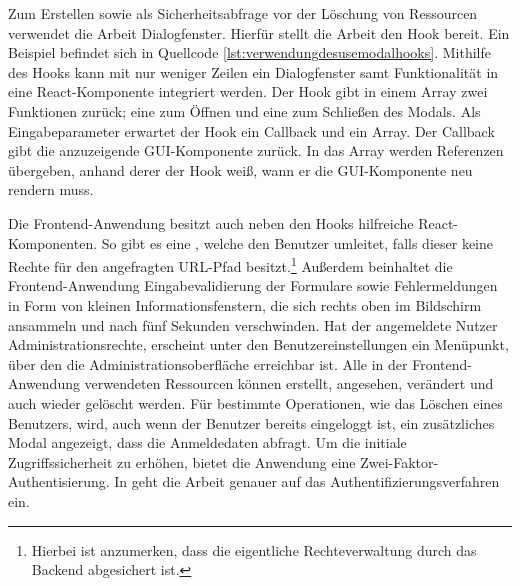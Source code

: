Zum Erstellen sowie als Sicherheitsabfrage vor der Löschung von Ressourcen verwendet die Arbeit Dialogfenster.
Hierfür stellt die Arbeit den  Hook bereit. Ein Beispiel befindet sich in
Quellcode \ref{lst:verwendungdesusemodalhooks}. Mithilfe des Hooks
kann mit nur weniger Zeilen ein Dialogfenster samt Funktionalität in eine React-Komponente integriert werden.
Der  Hook gibt in einem Array zwei Funktionen zurück; eine zum Öffnen und eine zum
Schließen des Modals. Als Eingabeparameter erwartet der Hook ein Callback und ein Array. Der Callback
gibt die anzuzeigende GUI-Komponente zurück. In das Array werden Referenzen übergeben, anhand derer
der Hook weiß, wann er die GUI-Komponente neu rendern muss.

Die Frontend\hyp{}Anwendung besitzt auch neben
den Hooks hilfreiche React\hyp{}Komponenten. So gibt es
eine , welche den Benutzer umleitet, falls dieser keine Rechte für den
angefragten URL-Pfad besitzt.\footnote{Hierbei ist anzumerken, dass die eigentliche Rechteverwaltung durch
das Backend abgesichert ist.} Außerdem beinhaltet die Frontend-Anwendung Eingabevalidierung der Formulare
sowie Fehlermeldungen in Form von kleinen Informationsfenstern, die sich rechts oben im Bildschirm ansammeln
und nach fünf Sekunden verschwinden. Hat der angemeldete Nutzer Administrationsrechte, erscheint unter den
Benutzereinstellungen ein Menüpunkt, über den die Administrationsoberfläche erreichbar ist. Alle in der
Frontend-Anwendung verwendeten Ressourcen können erstellt, angesehen, verändert und auch wieder gelöscht werden.
Für bestimmte Operationen, wie das Löschen eines Benutzers, wird, auch wenn der Benutzer bereits eingeloggt ist,
ein zusätzliches Modal angezeigt, dass die Anmeldedaten abfragt. Um die initiale Zugriffssicherheit zu erhöhen,
bietet die Anwendung eine Zwei-Faktor-Authentisierung. In  geht die
Arbeit genauer auf das Authentifizierungsverfahren ein.

